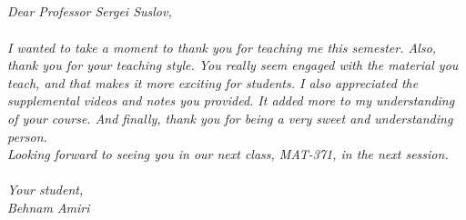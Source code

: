 \documentclass[fleqn]{article}
\begin{document}


  \textcolor{hwColor}{
    \\
    \\
    \\
    \\
    \\
    \\
    \\
    \\
    \\
    \textit{Dear Professor Sergei Suslov,} 
    \\
    \\
    \textit{I wanted to take a moment to thank you for teaching me this semester. Also, thank you for your teaching style. You really seem engaged with the material you teach, and that makes it more exciting for students. I also appreciated the supplemental videos and notes you provided. It added more to my understanding of your course. And finally, thank you for being a very sweet and understanding person.}
    \\
    \textit{Looking forward to seeing you in our next class, MAT-371, in the next session.}
    \\
    \\
    \textit{Your student,}
    \\
    \textit{Behnam Amiri}
  }
\end{document}

